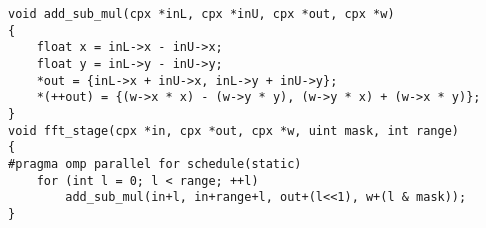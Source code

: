 \begin{lstlisting}
void add_sub_mul(cpx *inL, cpx *inU, cpx *out, cpx *w)
{
    float x = inL->x - inU->x;
    float y = inL->y - inU->y;
    *out = {inL->x + inU->x, inL->y + inU->y};
    *(++out) = {(w->x * x) - (w->y * y), (w->y * x) + (w->x * y)};
}
void fft_stage(cpx *in, cpx *out, cpx *w, uint mask, int range)
{
#pragma omp parallel for schedule(static)
    for (int l = 0; l < range; ++l)
        add_sub_mul(in+l, in+range+l, out+(l<<1), w+(l & mask));
}
\end{lstlisting}